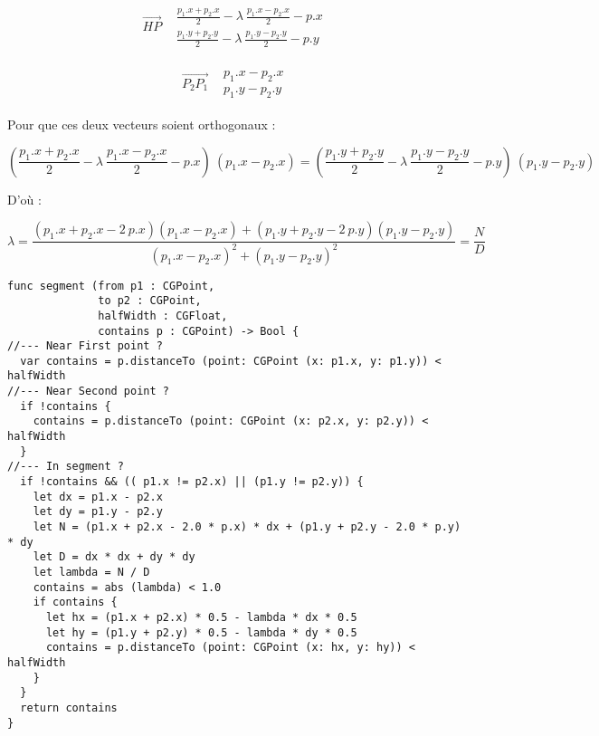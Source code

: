 \begin{equation*}
  \begin{array}{r|l}
    \overrightarrow{HP}
  &
    \begin{array}{l}
      \displaystyle\frac{p_1.x + p_2.x}{2} - \lambda ~ \frac{p_1.x - p_2.x}{2} - p.x
    \\
      \displaystyle\frac{p_1.y + p_2.y}{2} - \lambda ~ \frac{p_1.y - p_2.y}{2} - p.y
    \end{array}
  \end{array}
\end{equation*}

\begin{equation*}
  \begin{array}{r|l}
    \overrightarrow{P_2P_1}
  &
    \begin{array}{l}
       p_1.x - p_2.x
    \\
       p_1.y - p_2.y
    \end{array}
  \end{array}
\end{equation*}

Pour que ces deux vecteurs soient orthogonaux :

\begin{equation*}
 (\displaystyle\frac{p_1.x + p_2.x}{2} - \lambda ~ \frac{p_1.x - p_2.x}{2} - p.x) ~ (p_1.x - p_2.x) = 
 (\displaystyle\frac{p_1.y + p_2.y}{2} - \lambda ~ \frac{p_1.y - p_2.y}{2} - p.y) ~ (p_1.y - p_2.y)
\end{equation*}

D'où :

\begin{equation*}
\lambda = \frac{(p_1.x + p_2.x - 2~p.x)(p_1.x - p_2.x) + (p_1.y + p_2.y - 2~p.y)(p_1.y - p_2.y)}{(p_1.x - p_2.x)^2 + (p_1.y - p_2.y)^2} = \frac{N}{D}
\end{equation*}


\begin{lstlisting}
func segment (from p1 : CGPoint,
              to p2 : CGPoint,
              halfWidth : CGFloat,
              contains p : CGPoint) -> Bool {
//--- Near First point ?
  var contains = p.distanceTo (point: CGPoint (x: p1.x, y: p1.y)) < halfWidth
//--- Near Second point ?
  if !contains {
    contains = p.distanceTo (point: CGPoint (x: p2.x, y: p2.y)) < halfWidth
  }
//--- In segment ?
  if !contains && (( p1.x != p2.x) || (p1.y != p2.y)) {
    let dx = p1.x - p2.x
    let dy = p1.y - p2.y
    let N = (p1.x + p2.x - 2.0 * p.x) * dx + (p1.y + p2.y - 2.0 * p.y) * dy
    let D = dx * dx + dy * dy
    let lambda = N / D
    contains = abs (lambda) < 1.0
    if contains {
      let hx = (p1.x + p2.x) * 0.5 - lambda * dx * 0.5
      let hy = (p1.y + p2.y) * 0.5 - lambda * dy * 0.5
      contains = p.distanceTo (point: CGPoint (x: hx, y: hy)) < halfWidth
    }
  }
  return contains
}
\end{lstlisting}









